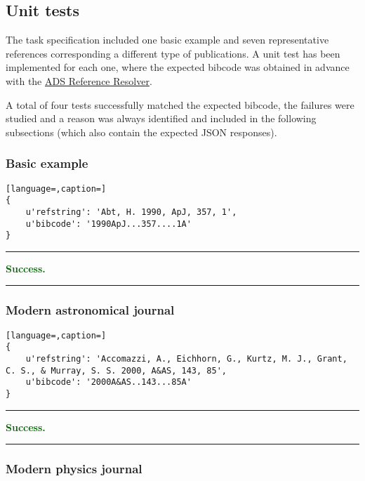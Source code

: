 \documentclass[a4paper,10pt,twoside]{article}
\begin{document}
\subsection{Unit tests}

The task specification included one basic example and seven representative references corresponding a different type of publications. A unit test has been implemented for each one, where the expected bibcode was obtained in advance with the \href{http://adsres.cfa.harvard.edu/cgi-bin/refcgi.py}{ADS Reference Resolver}. 

A total of four tests successfully matched the expected bibcode, the failures were studied and a reason was always identified and included in the following subsections (which also contain the expected JSON responses).

\subsubsection{Basic example}

\begin{lstlisting}[language=,caption=]
{
	u'refstring': 'Abt, H. 1990, ApJ, 357, 1',
	u'bibcode': '1990ApJ...357....1A'
}
\end{lstlisting}

\noindent
{\color{darkgreen} \rule{\linewidth}{0.5mm} }
\textbf{\textcolor{darkgreen}{Success.}} \\
\noindent
{\color{darkgreen} \rule{\linewidth}{0.5mm} }

\subsubsection{Modern astronomical journal}

\begin{lstlisting}[language=,caption=]
{
	u'refstring': 'Accomazzi, A., Eichhorn, G., Kurtz, M. J., Grant, C. S., & Murray, S. S. 2000, A&AS, 143, 85',
	u'bibcode': '2000A&AS..143...85A'
}
\end{lstlisting}

\noindent
{\color{darkgreen} \rule{\linewidth}{0.5mm} }
\textbf{\textcolor{darkgreen}{Success.}} \\
\noindent
{\color{darkgreen} \rule{\linewidth}{0.5mm} }

\subsubsection{Modern physics journal}
\end{document}
